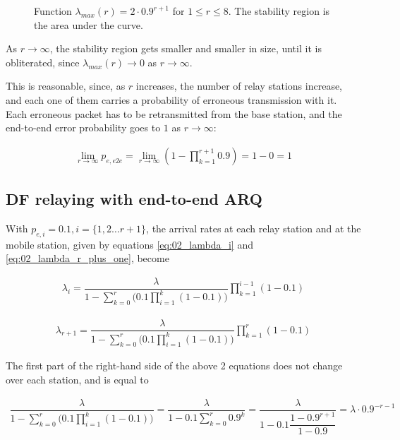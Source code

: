 \begin{figure}\centering
  
  \caption{Function $\lambda_{max}(r) = 2\cdot 0.9^{r+1}$ for $1 \leq r \leq 8$.
    The stability region is the area under the curve.}
  \label{fig:04_stability_region_af_e2e}
\end{figure}

As $r \to \infty$, the stability region gets smaller and smaller in size, until
it is obliterated, since $\lambda_{max}(r) \to 0$ as $r \to \infty$.

This is reasonable, since, as $r$ increases, the number of relay stations
increase, and each one of them carries a probability of erroneous transmission
with it. Each erroneous packet has to be retransmitted from the base station,
and the end-to-end error probability goes to $1$ as $r \to \infty$:

\begin{align*}
  \displaystyle \lim_{r \to \infty} p_{e,e2e} = \lim_{r \to \infty} (1 - \prod\limits_{k=1}^{r+1} 0.9) = 1 - 0 = 1
\end{align*}


\subsection{DF relaying with end-to-end ARQ}

With $p_{e,i} = 0.1, i = \{1,2 \dots r+1\}$, the arrival rates at each relay
station and at the mobile station, given by equations \ref{eq:02_lambda_i}
and \ref{eq:02_lambda_r_plus_one}, become

\begin{align}
  \lambda_i = \dfrac{\lambda}{1 - \sum\limits_{k=0}^r \Big(0.1 \prod\limits_{i=1}^k (1 - 0.1)\Big)} \prod\limits_{k=1}^{i-1} (1 - 0.1)
  \label{eq:04_stability_region_df_e2e_lambda_i}
\end{align}

\begin{align}
  \lambda_{r+1} = \dfrac{\lambda}{1 - \sum\limits_{k=0}^r \Big(0.1 \prod\limits_{i=1}^k (1 - 0.1)\Big)} \prod\limits_{k=1}^{r} (1 - 0.1)
  \label{eq:04_stability_region_df_e2e_lambda_r_plus_one}
\end{align}

The first part of the right-hand side of the above 2 equations does not change
over each station, and is equal to

\begin{align*}
  \dfrac{\lambda}{1 - \sum\limits_{k=0}^r \Big(0.1 \prod\limits_{i=1}^k (1 - 0.1)\Big)} =
  \dfrac{\lambda}{1 - 0.1 \sum\limits_{k=0}^r 0.9^k} =
  \dfrac{\lambda}{1 - 0.1 \dfrac{1 - 0.9^{r+1}}{1- 0.9}} =
  \lambda \cdot 0.9^{-r-1}
\end{align*}

